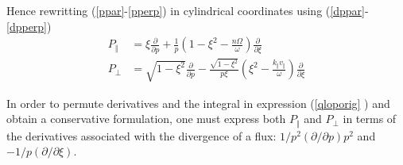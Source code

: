 Hence rewritting (\ref{ppar}-\ref{pperp}) in cylindrical coordinates using
(\ref{dppar}-\ref{dpperp})
\begin{align}
P_{\Vert}  &  =\xi\frac{\partial}{\partial p}+\frac{1}{p}\left(  1-\xi
^{2}-\frac{n\Omega}{\omega}\right)  \frac{\partial}{\partial\xi}%
\label{ppar2}\\
P_{\bot}  &  =\sqrt{1-\xi^{2}}\frac{\partial}{\partial p}-\frac{\sqrt
{1-\xi^{2}}}{p\xi}\left(  \xi^{2}-\frac{k_{\Vert}v_{\Vert}}{\omega}\right)
\frac{\partial}{\partial\xi} \label{pperp2}%
\end{align}

In order to permute derivatives and the integral in expression (\ref{qloporig}%
) and obtain a conservative formulation, one must express both $P_{\Vert}$ and
$P_{\bot}$ in terms of the derivatives associated with the divergence of a
flux: $1/p^{2}\left(  \partial/\partial p\right)  p^{2}$ and $-1/p\left(
\partial/\partial\xi\right)  $.

